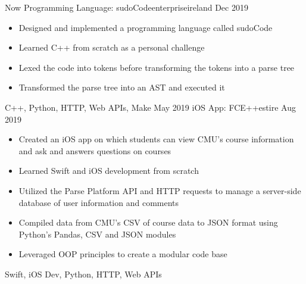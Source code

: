 %
%
%
\begin{experiences}
  \experience
    {Now}   {Programming Language: sudoCode}{enterprise}{ireland}
    {Dec 2019} {
                      \begin{itemize}
                        \item Designed and implemented a programming language called sudoCode                        
                        \item Learned C++ from scratch as a personal challenge                    
                        \item Lexed the code into tokens before transforming the tokens into a parse tree             
                        \item Transformed the parse tree into an AST and executed it                                                             
                      \end{itemize}
                    }
                    {C++, Python, HTTP, Web APIs, Make}
  \emptySeparator
  \experience
    {May 2019} {iOS App: FCE++}{est}{ire}
    {Aug 2019}    {
                      \begin{itemize}
                        \item Created an iOS app on which students can view CMU’s course information and ask and answers questions on courses                          
                        \item Learned Swift and iOS development from scratch
                        \item Utilized the Parse Platform API and HTTP requests to manage a server-side database of user information and comments 
                        \item Compiled data from CMU’s CSV of course data to JSON format using Python’s Pandas, CSV and JSON modules 
                        \item Leveraged OOP principles to create a modular code base
                      \end{itemize}
                    }
                    {Swift, iOS Dev, Python, HTTP, Web APIs}
  \emptySeparator
 
\end{experiences}
